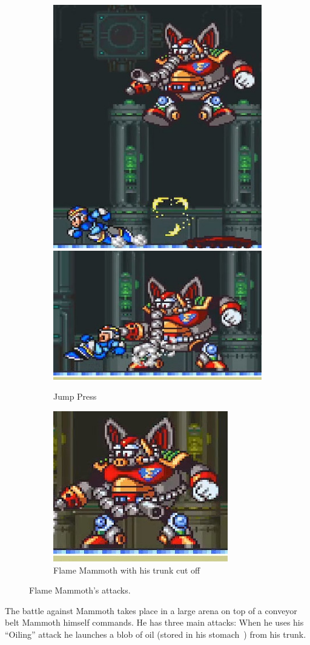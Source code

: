 \begin{figure}[htp]
	\begin{subfigure}{\textwidth}
		\centering
		\includegraphics[width=0.3\linewidth]{figures/X1/Flame_mammoth/Mammoth_press_1.jpg}
		\includegraphics[width=0.4\linewidth]{figures/X1/Flame_mammoth/Mammoth_press_2.jpg}
		\caption{Jump Press}
	\end{subfigure}
	\begin{subfigure}{0.3\textwidth}
		\centering
		\includegraphics[width=\linewidth]{figures/X1/Flame_mammoth/Mammoth_cut.jpg}
		\caption{Flame Mammoth with his trunk cut off}
	\end{subfigure}
	\caption{Flame Mammoth's attacks.}
\end{figure}
The battle against Mammoth takes place in a large arena on top of a conveyor belt Mammoth himself commands. He has three main attacks: When he uses his ``Oiling'' attack he launches a blob of oil (stored in his stomach~\cite{wayback:X_resources}) from his trunk. 
